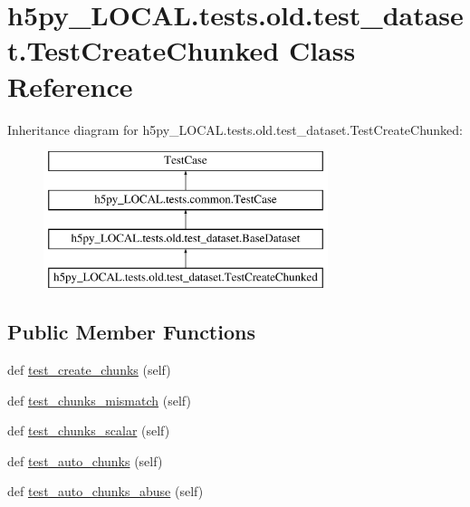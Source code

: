 \hypertarget{classh5py__LOCAL_1_1tests_1_1old_1_1test__dataset_1_1TestCreateChunked}{}\section{h5py\+\_\+\+L\+O\+C\+A\+L.\+tests.\+old.\+test\+\_\+dataset.\+Test\+Create\+Chunked Class Reference}
\label{classh5py__LOCAL_1_1tests_1_1old_1_1test__dataset_1_1TestCreateChunked}
Inheritance diagram for h5py\+\_\+\+L\+O\+C\+A\+L.\+tests.\+old.\+test\+\_\+dataset.\+Test\+Create\+Chunked\+:\begin{figure}[H]
\begin{center}
\leavevmode
\includegraphics[height=4.000000cm]{classh5py__LOCAL_1_1tests_1_1old_1_1test__dataset_1_1TestCreateChunked}
\end{center}
\end{figure}
\subsection*{Public Member Functions}
\begin{DoxyCompactItemize}
\item 
def \hyperlink{classh5py__LOCAL_1_1tests_1_1old_1_1test__dataset_1_1TestCreateChunked_ae22519e7713518892334a1d61f9aa5f5}{test\+\_\+create\+\_\+chunks} (self)
\item 
def \hyperlink{classh5py__LOCAL_1_1tests_1_1old_1_1test__dataset_1_1TestCreateChunked_a35fa8622bca4a32c25826a616c0c030a}{test\+\_\+chunks\+\_\+mismatch} (self)
\item 
def \hyperlink{classh5py__LOCAL_1_1tests_1_1old_1_1test__dataset_1_1TestCreateChunked_ab184da302b83f5813e3a8bfe3ea7defc}{test\+\_\+chunks\+\_\+scalar} (self)
\item 
def \hyperlink{classh5py__LOCAL_1_1tests_1_1old_1_1test__dataset_1_1TestCreateChunked_a6a7bb56074bd7cf64a6b0bb8e52d0d4c}{test\+\_\+auto\+\_\+chunks} (self)
\item 
def \hyperlink{classh5py__LOCAL_1_1tests_1_1old_1_1test__dataset_1_1TestCreateChunked_af28e175afc54d0ff5f602c1308da7bda}{test\+\_\+auto\+\_\+chunks\+\_\+abuse} (self)
\end{DoxyCompactItemize}
